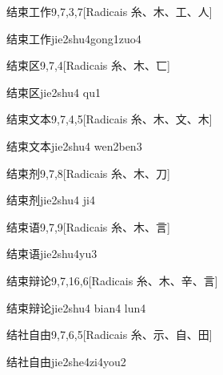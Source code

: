 \begin{entry}{结束工作}{9,7,3,7}[Radicais ⽷、⽊、⼯、⼈]
  \begin{phonetics}{结束工作}{jie2shu4gong1zuo4}
  \end{phonetics}
\end{entry}

\begin{entry}{结束区}{9,7,4}[Radicais ⽷、⽊、⼖]
  \begin{phonetics}{结束区}{jie2shu4 qu1}
  \end{phonetics}
\end{entry}

\begin{entry}{结束文本}{9,7,4,5}[Radicais ⽷、⽊、⽂、⽊]
  \begin{phonetics}{结束文本}{jie2shu4 wen2ben3}
  \end{phonetics}
\end{entry}

\begin{entry}{结束剂}{9,7,8}[Radicais ⽷、⽊、⼑]
  \begin{phonetics}{结束剂}{jie2shu4 ji4}
  \end{phonetics}
\end{entry}

\begin{entry}{结束语}{9,7,9}[Radicais ⽷、⽊、⾔]
  \begin{phonetics}{结束语}{jie2shu4yu3}
  \end{phonetics}
\end{entry}

\begin{entry}{结束辩论}{9,7,16,6}[Radicais ⽷、⽊、⾟、⾔]
  \begin{phonetics}{结束辩论}{jie2shu4 bian4 lun4}
  \end{phonetics}
\end{entry}

\begin{entry}{结社自由}{9,7,6,5}[Radicais ⽷、⽰、⾃、⽥]
  \begin{phonetics}{结社自由}{jie2she4zi4you2}
  \end{phonetics}
\end{entry}

